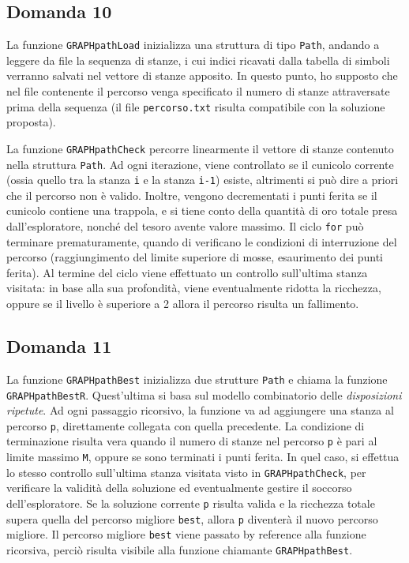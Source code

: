 \documentclass[a4paper]{article}
\newcommand{\code}[1]{\texttt{#1}}
\begin{document}
    \subsection*{Domanda 10}
    La funzione \code{GRAPHpathLoad} inizializza una struttura di tipo \code{Path}, andando a leggere da file la sequenza di stanze, i cui indici ricavati dalla tabella di simboli verranno salvati nel vettore di stanze apposito. In questo punto, ho supposto che nel file contenente il percorso venga specificato il numero di stanze attraversate prima della sequenza (il file \code{percorso.txt} risulta compatibile con la soluzione proposta).
    
    La funzione \code{GRAPHpathCheck} percorre linearmente il vettore di stanze contenuto nella struttura \code{Path}. Ad ogni iterazione, viene controllato se il cunicolo corrente (ossia quello tra la stanza \code{i} e la stanza \code{i-1}) esiste, altrimenti si può dire a priori che il percorso non è valido. Inoltre, vengono decrementati i punti ferita se il cunicolo contiene una trappola, e si tiene conto della quantità di oro totale presa dall'esploratore, nonché del tesoro avente valore massimo. Il ciclo \code{for} può terminare prematuramente, quando di verificano le condizioni di interruzione del percorso (raggiungimento del limite superiore di mosse, esaurimento dei punti ferita). Al termine del ciclo viene effettuato un controllo sull'ultima stanza visitata: in base alla sua profondità, viene eventualmente ridotta la ricchezza, oppure se il livello è superiore a 2 allora il percorso risulta un fallimento.
    
    \subsection*{Domanda 11}
    La funzione \code{GRAPHpathBest} inizializza due strutture \code{Path} e chiama la funzione \code{GRAPHpathBestR}. Quest'ultima si basa sul modello combinatorio delle \emph{disposizioni ripetute}. Ad ogni passaggio ricorsivo, la funzione va ad aggiungere una stanza al percorso \code{p}, direttamente collegata con quella precedente. La condizione di terminazione risulta vera quando il numero di stanze nel percorso \code{p} è pari al limite massimo \code{M}, oppure se sono terminati i punti ferita. In quel caso, si effettua lo stesso controllo sull'ultima stanza visitata visto in \code{GRAPHpathCheck}, per verificare la validità della soluzione ed eventualmente gestire il soccorso dell'esploratore. Se la soluzione corrente \code{p} risulta valida e la ricchezza totale supera quella del percorso migliore \code{best}, allora \code{p} diventerà il nuovo percorso migliore. Il percorso migliore \code{best} viene passato by reference alla funzione ricorsiva, perciò risulta visibile alla funzione chiamante \code{GRAPHpathBest}.
\end{document}
